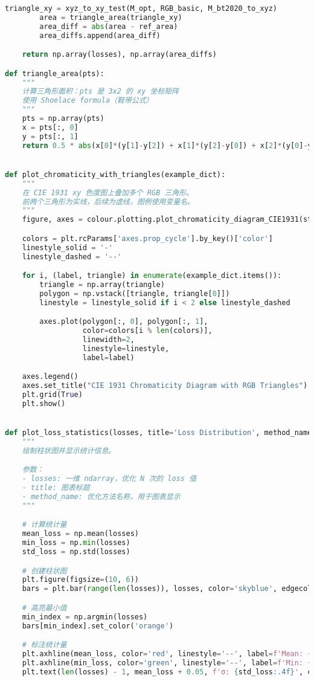 \begin{lstlisting}[language=Python]
        triangle_xy = xyz_to_xy_test(M_opt, RGB_basic, M_bt2020_to_xyz)
        area = triangle_area(triangle_xy)
        area_diff = abs(area - ref_area)
        area_diffs.append(area_diff)

    return np.array(losses), np.array(area_diffs)

def triangle_area(pts):
    """
    计算三角形面积：pts 是 3x2 的 xy 坐标矩阵
    使用 Shoelace formula（鞋带公式）
    """
    pts = np.array(pts)
    x = pts[:, 0]
    y = pts[:, 1]
    return 0.5 * abs(x[0]*(y[1]-y[2]) + x[1]*(y[2]-y[0]) + x[2]*(y[0]-y[1]))


def plot_chromaticity_with_triangles(example_dict):
    """
    在 CIE 1931 xy 色度图上叠加多个 RGB 三角形。
    前两个三角形为实线，后续为虚线，图例使用变量名。
    """
    figure, axes = colour.plotting.plot_chromaticity_diagram_CIE1931(standalone=False)

    colors = plt.rcParams['axes.prop_cycle'].by_key()['color']
    linestyle_solid = '-'
    linestyle_dashed = '--'

    for i, (label, triangle) in enumerate(example_dict.items()):
        triangle = np.array(triangle)
        polygon = np.vstack([triangle, triangle[0]])
        linestyle = linestyle_solid if i < 2 else linestyle_dashed

        axes.plot(polygon[:, 0], polygon[:, 1],
                  color=colors[i % len(colors)],
                  linewidth=2,
                  linestyle=linestyle,
                  label=label)

    axes.legend()
    axes.set_title("CIE 1931 Chromaticity Diagram with RGB Triangles")
    plt.grid(True)
    plt.show()


def plot_loss_statistics(losses, title='Loss Distribution', method_name='L-BFGS-B'):
    """
    绘制柱状图并显示统计信息。

    参数：
    - losses: 一维 ndarray，优化 N 次的 loss 值
    - title: 图表标题
    - method_name: 优化方法名称，用于图表显示
    """

    # 计算统计量
    mean_loss = np.mean(losses)
    min_loss = np.min(losses)
    std_loss = np.std(losses)

    # 创建柱状图
    plt.figure(figsize=(10, 6))
    bars = plt.bar(range(len(losses)), losses, color='skyblue', edgecolor='black')

    # 高亮最小值
    min_index = np.argmin(losses)
    bars[min_index].set_color('orange')

    # 标注统计量
    plt.axhline(mean_loss, color='red', linestyle='--', label=f'Mean: {mean_loss:.4f}')
    plt.axhline(min_loss, color='green', linestyle='--', label=f'Min: {min_loss:.4f}')
    plt.text(len(losses) - 1, mean_loss + 0.05, f'σ: {std_loss:.4f}', color='red', fontsize=10, ha='right')


\end{lstlisting}
